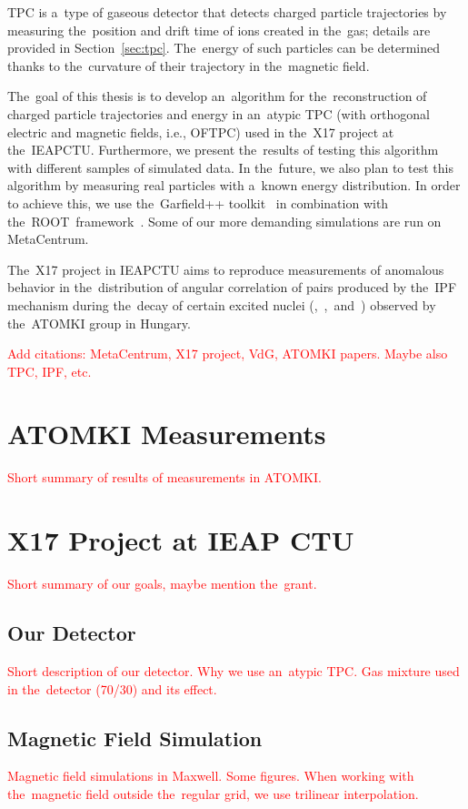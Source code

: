 	\ac{TPC} is a~type of gaseous detector that detects charged particle trajectories by measuring the~position and drift time of ions created in the~gas; details are provided in Section~\ref{sec:tpc}. The~energy of such particles can be determined thanks to the~curvature of their trajectory in the~magnetic field.
	
	The~goal of this thesis is to develop an~algorithm for the~reconstruction of charged particle trajectories and energy in an~atypic \ac{TPC} (with orthogonal electric and magnetic fields, i.e., \ac{OFTPC}) used in the~X17 project at the~\ac{IEAPCTU}. Furthermore, we present the~results of testing this algorithm with different samples of simulated data. In the~future, we also plan to test this algorithm by measuring real particles with a~known energy distribution. In order to achieve this, we use the~Garfield++ toolkit~\cite{Garfield++} in combination with the~ROOT~framework~\cite{ROOT}. Some of our more demanding simulations are run on MetaCentrum.
	
	The~X17 project in \ac{IEAPCTU} aims to reproduce measurements of anomalous behavior in the~distribution of angular correlation of pairs produced by the~\ac{IPF} mechanism during the~decay of certain excited nuclei (,~,~and~) observed by the~ATOMKI group in Hungary. 
	
	\textcolor{red}{Add citations: MetaCentrum, X17 project, VdG, ATOMKI papers. Maybe also TPC, IPF, etc.}
	
	\section{ATOMKI Measurements}
	\textcolor{red}{Short summary of results of measurements in ATOMKI.}
	
	\section{X17 Project at IEAP CTU}
	\label{sec:IEAP}
		\textcolor{red}{Short summary of our goals, maybe mention the~grant.}
	
		\subsection{Our Detector}
		\textcolor{red}{Short description of our detector. Why we use an~atypic TPC. Gas mixture used in the~detector (70/30) and its effect.}
		
		\subsection{Magnetic Field Simulation}
		\textcolor{red}{Magnetic field simulations in Maxwell. Some figures. When working with the~magnetic field outside the~regular grid, we use trilinear interpolation.}
		
